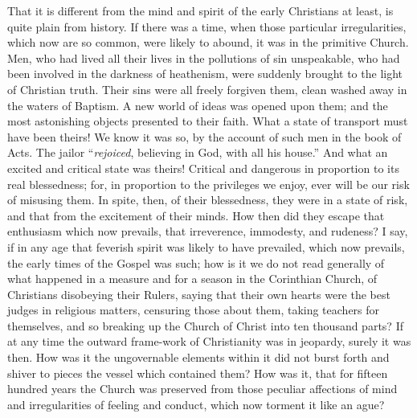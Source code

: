 That it is different from the mind and spirit of the early
Christians at least, is quite plain from history. If there was a time,
when those particular irregularities, which now are so common, were
likely to abound, it was in the primitive Church. Men, who had lived
all their lives in the pollutions of sin unspeakable, who had been
involved in the darkness of heathenism, were suddenly brought to the
light of Christian truth. Their sins were all freely forgiven them,
clean washed away in the waters of Baptism. A new world of ideas was
opened upon them; and the most astonishing objects presented to their
faith. What a state of transport must have been theirs! We know it was
so, by the account of such men in the book of Acts. The jailor ``\emph{rejoiced},
believing in God, with all his house.'' And what an excited and
critical state was theirs! Critical and dangerous in proportion to its
real blessedness; for, in proportion to the privileges we enjoy, ever
will be our risk of misusing them. In spite, then, of their
blessedness, they were in a state of risk, and that from the
excitement of their minds. How then did they escape that enthusiasm
which now prevails, that irreverence, immodesty, and rudeness? I say,
if in any age that feverish spirit was likely to have prevailed, which
now prevails, the early times of the Gospel was such; how is it we do
not read generally of what happened in a measure and for a season in
the Corinthian Church, of Christians disobeying their Rulers, saying
that their own hearts were the best judges in religious matters,
censuring those about them, taking teachers for themselves, and so
breaking up the Church of Christ into ten thousand parts? If at any
time the outward frame-work of Christianity was in jeopardy, surely it
was then. How was it the ungovernable elements within it did not burst
forth and shiver to pieces the vessel which contained them? How was
it, that for fifteen hundred years the Church was preserved from those
peculiar affections of mind and irregularities of feeling and conduct,
which now torment it like an ague?

